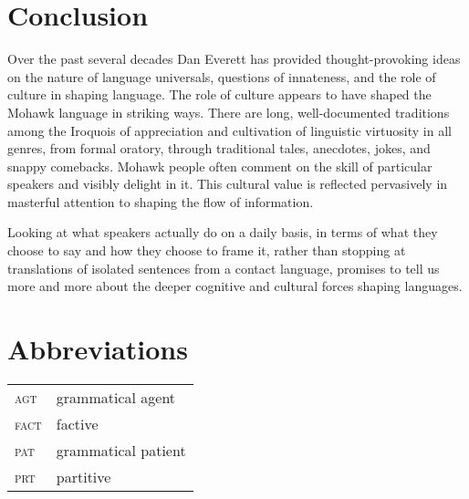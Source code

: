 \documentclass[output=paper,colorlinks,citecolor=brown]{langscibook}
\begin{document}
\section{Conclusion}

Over the past several decades Dan Everett has provided thought-provoking ideas on the nature of language universals, questions of innateness, and the role of culture in shaping language. The role of culture appears to have shaped the Mohawk language in striking ways. There are long, well-documented traditions among the Iroquois of appreciation and cultivation of linguistic virtuosity in all genres, from formal oratory, through traditional tales, anecdotes, jokes, and snappy comebacks. Mohawk people often comment on the skill of particular speakers and visibly delight in it. This cultural value is reflected pervasively in masterful attention to shaping the flow of information.

Looking at what speakers actually do on a daily basis, in terms of what they choose to say and how they choose to frame it, rather than stopping at translations of isolated sentences from a contact language, promises to tell us more and more about the deeper cognitive and cultural forces shaping languages.

\section*{Abbreviations}
\begin{tabularx}{.5\textwidth}{@{}lQ}

\textsc{agt} & grammatical agent \\
\textsc{fact} & factive \\
\textsc{pat} & grammatical patient \\
\textsc{prt} & partitive \\

\end{tabularx}

\printbibliography[heading=subbibliography,notkeyword=this]
\end{document}

